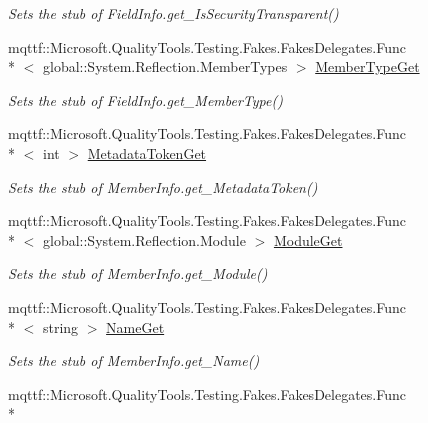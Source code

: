 \begin{DoxyCompactItemize}
\begin{DoxyCompactList}\small\item\em Sets the stub of Field\-Info.\-get\-\_\-\-Is\-Security\-Transparent()\end{DoxyCompactList}\item 
mqttf\-::\-Microsoft.\-Quality\-Tools.\-Testing.\-Fakes.\-Fakes\-Delegates.\-Func\\*
$<$ global\-::\-System.\-Reflection.\-Member\-Types $>$ \hyperlink{class_system_1_1_reflection_1_1_fakes_1_1_stub_field_info_a3bfff5634f79d2fc53e10d53f211b194}{Member\-Type\-Get}
\begin{DoxyCompactList}\small\item\em Sets the stub of Field\-Info.\-get\-\_\-\-Member\-Type()\end{DoxyCompactList}\item 
mqttf\-::\-Microsoft.\-Quality\-Tools.\-Testing.\-Fakes.\-Fakes\-Delegates.\-Func\\*
$<$ int $>$ \hyperlink{class_system_1_1_reflection_1_1_fakes_1_1_stub_field_info_a31fdb8aaa9b80aab81cfb3ef94df3ab8}{Metadata\-Token\-Get}
\begin{DoxyCompactList}\small\item\em Sets the stub of Member\-Info.\-get\-\_\-\-Metadata\-Token()\end{DoxyCompactList}\item 
mqttf\-::\-Microsoft.\-Quality\-Tools.\-Testing.\-Fakes.\-Fakes\-Delegates.\-Func\\*
$<$ global\-::\-System.\-Reflection.\-Module $>$ \hyperlink{class_system_1_1_reflection_1_1_fakes_1_1_stub_field_info_a847a9c1647e6df9a170f1a11ce8de220}{Module\-Get}
\begin{DoxyCompactList}\small\item\em Sets the stub of Member\-Info.\-get\-\_\-\-Module()\end{DoxyCompactList}\item 
mqttf\-::\-Microsoft.\-Quality\-Tools.\-Testing.\-Fakes.\-Fakes\-Delegates.\-Func\\*
$<$ string $>$ \hyperlink{class_system_1_1_reflection_1_1_fakes_1_1_stub_field_info_a296af9a50bacc115083b64e6d0facf2b}{Name\-Get}
\begin{DoxyCompactList}\small\item\em Sets the stub of Member\-Info.\-get\-\_\-\-Name()\end{DoxyCompactList}\item 
mqttf\-::\-Microsoft.\-Quality\-Tools.\-Testing.\-Fakes.\-Fakes\-Delegates.\-Func\\*

\end{DoxyCompactItemize}
